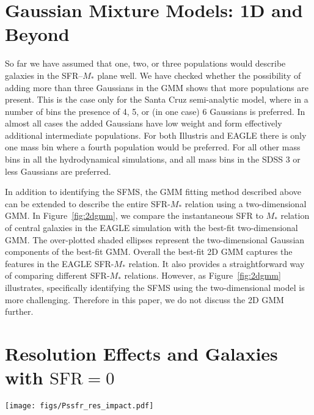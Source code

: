 \documentclass[preprint2,tighten]{aastex62}
\begin{document}
\section{Gaussian Mixture Models: 1D and Beyond} \label{app:gmm}
So far we have assumed that one, two, or three populations would describe galaxies in the SFR--$M_*$ plane well. We have checked whether the possibility of adding more than three Gaussians in the GMM shows that more populations are present. This is the case only for the Santa Cruz semi-analytic model, where in a number of bins the presence of 4, 5, or (in one case) 6 Gaussians is preferred. In almost all cases the added Gaussians have low weight and form effectively additional intermediate populations. For both Illustris and EAGLE there is only one mass bin where a fourth population would be preferred. For all other mass bins in all the hydrodynamical simulations, and all mass bins in the SDSS 3 or less Gaussians are preferred.


In addition to identifying the SFMS, the GMM fitting method described above can 
be extended to describe the entire SFR-$M_*$ relation using a two-dimensional 
GMM. In Figure~\ref{fig:2dgmm}, we compare the instantaneous SFR to $M_*$ relation 
of central galaxies in the EAGLE simulation with the best-fit two-dimensional GMM. 
The over-plotted shaded ellipses represent the two-dimensional Gaussian components
of the best-fit GMM. Overall the best-fit 2D GMM captures the features in the 
EAGLE SFR-$M_*$ relation. It also provides a straightforward way of comparing 
different SFR-$M_*$ relations. However, as Figure~\ref{fig:2dgmm} illustrates, 
specifically identifying the SFMS using the two-dimensional model is more 
challenging. Therefore in this paper, we do not discuss the 2D GMM further. 


\section{Resolution Effects and Galaxies with $\mathrm{SFR} = 0$} \label{app:zerosfr}

\begin{figure*}
\begin{center}
\texttt{[image: figs/Pssfr\_res\_impact.pdf]} 
\caption{The impact of SFR resolution and galaxies with SFR$=0$, on 
the SSFR distribution, $P(\mathrm{SSFR})$, of Illustris, EAGLE, and 
MUFSAS simulations. We plot $P(\mathrm{SSFR})$ with $\mathrm{SFR} = 0$
galaxies in blue and $P(\mathrm{SSFR})$ without $\mathrm{SFR} = 0$ 
galaxies in black. The uncertainties of $P(\mathrm{SSFR})$ is obtained 
from re-sampling the SFR of each galaxy based on the SFR resolution, 
as described in  Appendix~\ref{app:zerosfr}. For each simulation, we 
present two distinct stellar mass bins to illustrate the impact at low 
and high $M_*$.
} 
\label{fig:zerosfr_res}
\end{center}
\end{figure*}
\end{document}
